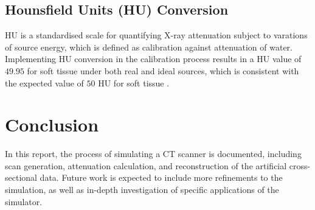 \documentclass[10pt,twocolumn]{article}
\begin{document}
\subsection{Hounsfield Units (HU) Conversion}
HU is a standardised scale for quantifying X-ray attenuation subject to varations of source energy, which is defined as calibration against attenuation of water. Implementing HU conversion in the calibration process results in a HU value of $49.95$ for soft tissue under both real and ideal sources, which is consistent with the expected value of $50$ HU for soft tissue \cite{KIM20133}.

\section{Conclusion}
In this report, the process of simulating a CT scanner is documented, including scan generation, attenuation calculation, and reconstruction of the artificial cross-sectional data.
Future work is expected to include more refinements to the simulation, as well as in-depth investigation of specific applications of the simulator.

\begingroup
\scriptsize


\endgroup
\end{document}
